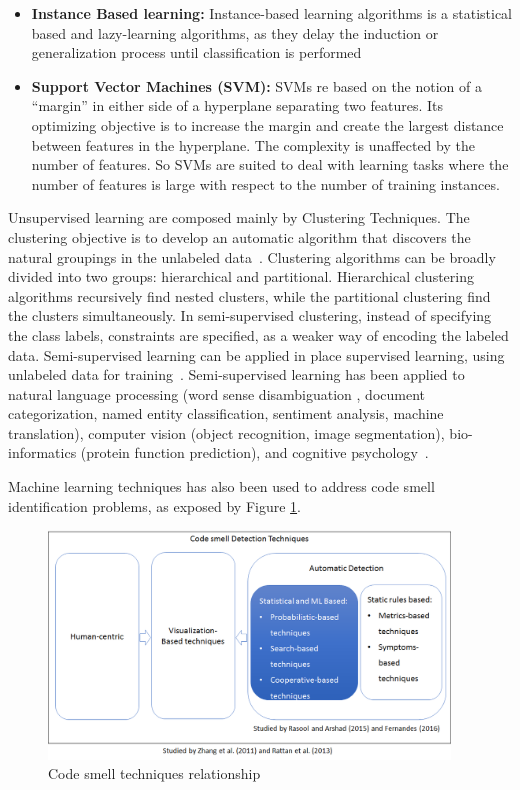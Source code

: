\begin{itemize}
    \item \textbf{Instance Based learning:}  Instance-based learning algorithms is a statistical based and lazy-learning algorithms, as they delay the induction or generalization process until classification is performed
    \item \textbf{Support Vector Machines (SVM):} SVMs re based on the notion of a “margin” in either side of a hyperplane separating two features. Its optimizing objective is to increase the margin and create the largest distance between features in the hyperplane. The complexity is unaffected by the number of features. So SVMs are suited to deal with learning tasks where the number of features is large with respect to the number of training instances.
\end{itemize}

Unsupervised learning are composed mainly by Clustering Techniques. The clustering objective is to develop an automatic algorithm that discovers the natural groupings in the unlabeled data~\citep{jain1999data}. Clustering algorithms can be broadly divided into two groups: hierarchical and partitional. Hierarchical clustering algorithms recursively find nested clusters, while the partitional clustering find the clusters simultaneously. In semi-supervised clustering, instead of specifying the class labels, constraints are specified, as a weaker way of encoding the labeled data. Semi-supervised learning can be applied in place supervised learning, using unlabeled data for training~\citep{jain2010data}. Semi-supervised learning has been applied to natural language processing (word sense disambiguation , document categorization, named entity classification, sentiment analysis, machine translation), computer vision (object recognition, image segmentation), bio-informatics (protein function prediction), and cognitive psychology~\citep{zhu2011semi}.

Machine learning techniques has also been used to address code smell identification problems, as exposed by Figure \ref{fig:smellDetectionTechniquesRelation}.

\begin{figure}[hbt] 
	\caption{Code smell techniques relationship}
	\label{fig:smellDetectionTechniquesRelation}
	\includegraphics[width=0.95\textwidth]{imagens/smellDetectionTechniquesRelation.png}
\end{figure}


